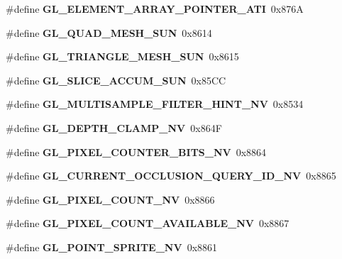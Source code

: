 \begin{DoxyCompactItemize}
\item 
\#define {\bfseries G\+L\+\_\+\+E\+L\+E\+M\+E\+N\+T\+\_\+\+A\+R\+R\+A\+Y\+\_\+\+P\+O\+I\+N\+T\+E\+R\+\_\+\+A\+T\+I}~0x876\+A\label{_s_d_l__opengl_8h_a1267937bb0aa30bfb3f500f6fc1974cb}

\item 
\#define {\bfseries G\+L\+\_\+\+Q\+U\+A\+D\+\_\+\+M\+E\+S\+H\+\_\+\+S\+U\+N}~0x8614\label{_s_d_l__opengl_8h_a2ab60eca80b88f476fde0b9c4c3d59f3}

\item 
\#define {\bfseries G\+L\+\_\+\+T\+R\+I\+A\+N\+G\+L\+E\+\_\+\+M\+E\+S\+H\+\_\+\+S\+U\+N}~0x8615\label{_s_d_l__opengl_8h_a57c713fb8af322ed512c0f78fd36da6d}

\item 
\#define {\bfseries G\+L\+\_\+\+S\+L\+I\+C\+E\+\_\+\+A\+C\+C\+U\+M\+\_\+\+S\+U\+N}~0x85\+C\+C\label{_s_d_l__opengl_8h_a7c248f34ba5e8cc18f97b920d445ac6f}

\item 
\#define {\bfseries G\+L\+\_\+\+M\+U\+L\+T\+I\+S\+A\+M\+P\+L\+E\+\_\+\+F\+I\+L\+T\+E\+R\+\_\+\+H\+I\+N\+T\+\_\+\+N\+V}~0x8534\label{_s_d_l__opengl_8h_a09a7a386351a919528a05f1de4a1b63a}

\item 
\#define {\bfseries G\+L\+\_\+\+D\+E\+P\+T\+H\+\_\+\+C\+L\+A\+M\+P\+\_\+\+N\+V}~0x864\+F\label{_s_d_l__opengl_8h_ac70f5bf5cffa2d34ab430be7f227a9dc}

\item 
\#define {\bfseries G\+L\+\_\+\+P\+I\+X\+E\+L\+\_\+\+C\+O\+U\+N\+T\+E\+R\+\_\+\+B\+I\+T\+S\+\_\+\+N\+V}~0x8864\label{_s_d_l__opengl_8h_a807384bc9938bee0332e9e7d53529c59}

\item 
\#define {\bfseries G\+L\+\_\+\+C\+U\+R\+R\+E\+N\+T\+\_\+\+O\+C\+C\+L\+U\+S\+I\+O\+N\+\_\+\+Q\+U\+E\+R\+Y\+\_\+\+I\+D\+\_\+\+N\+V}~0x8865\label{_s_d_l__opengl_8h_a35f2764ee5d8eba42a94941a30f08780}

\item 
\#define {\bfseries G\+L\+\_\+\+P\+I\+X\+E\+L\+\_\+\+C\+O\+U\+N\+T\+\_\+\+N\+V}~0x8866\label{_s_d_l__opengl_8h_adb91e91e14493a8b6ea4b32125d96b0b}

\item 
\#define {\bfseries G\+L\+\_\+\+P\+I\+X\+E\+L\+\_\+\+C\+O\+U\+N\+T\+\_\+\+A\+V\+A\+I\+L\+A\+B\+L\+E\+\_\+\+N\+V}~0x8867\label{_s_d_l__opengl_8h_a06b4a45c10129a462b1f151222fb075a}

\item 
\#define {\bfseries G\+L\+\_\+\+P\+O\+I\+N\+T\+\_\+\+S\+P\+R\+I\+T\+E\+\_\+\+N\+V}~0x8861\label{_s_d_l__opengl_8h_a2ec2cfb8a19b87634e79d343067505c9}


\end{DoxyCompactItemize}
